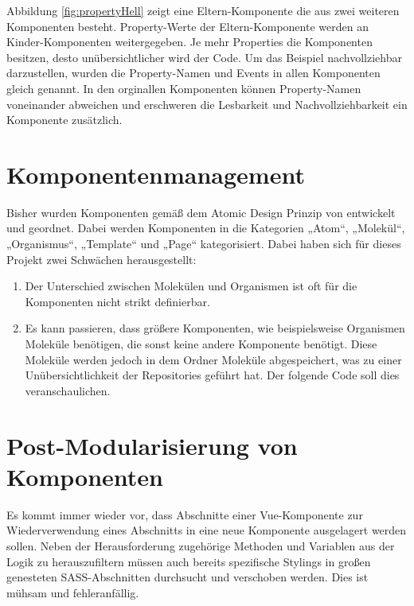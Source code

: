 Abbildung \ref{fig:propertyHell} zeigt eine Eltern-Komponente die aus zwei weiteren Komponenten besteht. Property-Werte der Eltern-Komponente werden an Kinder-Komponenten weitergegeben. Je mehr Properties die Komponenten besitzen, desto unübersichtlicher wird der Code. Um das Beispiel nachvollziehbar darzustellen, wurden die Property-Namen und Events in allen Komponenten gleich genannt. In den orginallen Komponenten können Property-Namen voneinander abweichen und erschweren die Lesbarkeit und Nachvollziehbarkeit ein Komponente zusätzlich.
 
\section{Komponentenmanagement}
\label{sec:componentManagement}
Bisher wurden Komponenten gemäß dem Atomic Design Prinzip von \cite{AtomicDesign} entwickelt und geordnet. Dabei werden Komponenten in die Kategorien „Atom“, „Molekül“, „Organismus“, „Template“ und „Page“ kategorisiert. Dabei haben sich für dieses Projekt zwei Schwächen herausgestellt:
\begin{enumerate}
 \item Der Unterschied zwischen Molekülen und Organismen ist oft für die Komponenten nicht strikt definierbar.
 \item Es kann passieren, dass größere Komponenten, wie beispielsweise Organismen Moleküle benötigen, die sonst keine andere Komponente benötigt. Diese Moleküle werden jedoch in dem Ordner Moleküle abgespeichert, was zu einer Unübersichtlichkeit der Repositories geführt hat. Der folgende Code soll dies veranschaulichen.
\end{enumerate}



\section{Post-Modularisierung von Komponenten}
\label{sec:postSplitting}
Es kommt immer wieder vor, dass Abschnitte einer Vue-Komponente zur Wiederverwendung eines Abschnitts in eine neue Komponente ausgelagert werden sollen. Neben der Herausforderung zugehörige Methoden und Variablen aus der Logik zu herauszufiltern müssen auch bereits spezifische Stylings in großen genesteten SASS-Abschnitten durchsucht und verschoben werden. Dies ist mühsam und fehleranfällig.

